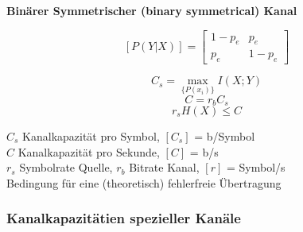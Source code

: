 \textbf{Binärer Symmetrischer (binary symmetrical) Kanal} \\
\begin{minipage}{14cm}

	$$ [P(Y | X)] = \begin{bmatrix}
           		1-p_e & p_e \\
           		p_e & 1-p_e
           \end{bmatrix} $$
\end{minipage}
\begin{minipage}{4cm}
\begin{center}
\end{center}
\end{minipage}




%

\begin{minipage}[c]{8cm}
	$$ C_s = \max\limits_{\{ P(x_i) \}}{I (X; Y)} $$
	$$ C = r_b C_s $$
	$$ r_s H(X) \leq C$$
\end{minipage}
\begin{minipage}[c]{10cm}
	$C_s$ Kanalkapazität pro Symbol, $[C_s]$ = b/Symbol \\
	$C$ Kanalkapazität pro Sekunde, $[C]$ = b/s \\
	$r_s$ Symbolrate Quelle, $r_b$ Bitrate Kanal, $[r]$ = Symbol/s \\
	Bedingung für eine (theoretisch) fehlerfreie Übertragung
\end{minipage}

\subsubsection{Kanalkapazitätien spezieller Kanäle}

